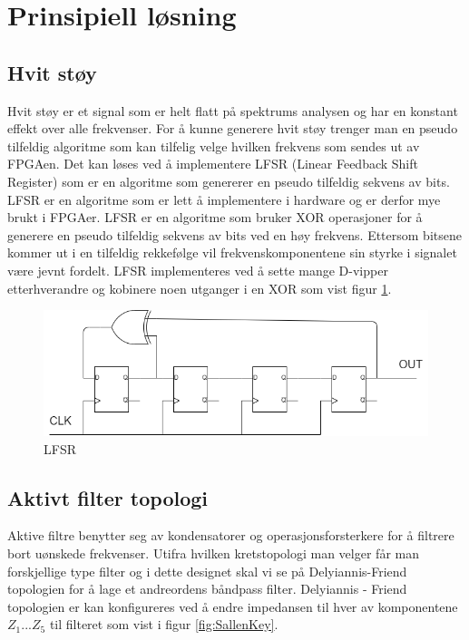 \newpage
\section{Prinsipiell løsning}
\label{prinsipiellLoesning}

\subsection{Hvit støy}
\label{hvitStoeoy}
Hvit støy er et signal som er helt flatt på spektrums analysen og har en konstant effekt over alle frekvenser. For å kunne generere hvit støy trenger man en pseudo tilfeldig algoritme som kan tilfelig velge hvilken frekvens som sendes ut av FPGAen. Det kan løses ved å implementere LFSR (Linear Feedback Shift Register) som er en algoritme som genererer en pseudo tilfeldig sekvens av bits. LFSR er en algoritme som er lett å implementere i hardware og er derfor mye brukt i FPGAer. LFSR er en algoritme som bruker XOR operasjoner for å generere en pseudo tilfeldig sekvens av bits ved en høy frekvens. Ettersom bitsene kommer ut i en tilfeldig rekkefølge vil frekvenskomponentene sin styrke i signalet være jevnt fordelt. LFSR implementeres ved å sette mange D-vipper etterhverandre og kobinere noen utganger i en XOR som vist figur \ref{fig:LFSR}.\cite{LFSR}

\begin{figure} [!h]
\centering
\includegraphics[width=1\linewidth]{Bilder/LFSR.drawio.png}
\caption{LFSR}
\label{fig:LFSR}
\end{figure}

\subsection{Aktivt filter topologi}
\label{aktivtFilter}

Aktive filtre benytter seg av kondensatorer og operasjonsforsterkere for å filtrere bort uønskede frekvenser. Utifra hvilken kretstopologi man velger får man forskjellige type filter og i dette designet skal vi se på Delyiannis-Friend topologien for å lage et andreordens båndpass filter. Delyiannis - Friend topologien er kan konfigureres ved å endre impedansen til hver av komponentene $Z_1 ... Z_5$ til filteret som vist i figur \ref{fig:SallenKey}\cite{Active Filter}. 

